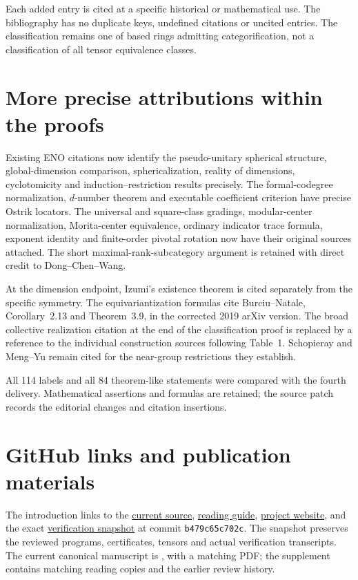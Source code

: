 \documentclass[11pt,a4paper]{article}
\begin{document}
Each added entry is cited at a specific historical or mathematical use.
The bibliography has no duplicate keys, undefined citations or uncited
entries. The classification remains one of based rings admitting
categorification, not a classification of all tensor equivalence classes.

\section*{More precise attributions within the proofs}

Existing ENO citations now identify the pseudo-unitary spherical
structure, global-dimension comparison, sphericalization, reality of
dimensions, cyclotomicity and induction--restriction results precisely.
The formal-codegree normalization, $d$-number theorem and executable
coefficient criterion have precise Ostrik locators. The universal and
square-class gradings, modular-center normalization, Morita-center
equivalence, ordinary indicator trace formula, exponent identity and
finite-order pivotal rotation now have their original sources attached.
The short maximal-rank-subcategory argument is retained with direct
credit to Dong--Chen--Wang.

At the dimension endpoint, Izumi's existence theorem is cited separately
from the specific symmetry. The equivariantization formulas cite
Burciu--Natale, Corollary~2.13 and Theorem~3.9, in the corrected 2019
arXiv version. The broad collective realization citation at the end of
the classification proof is replaced by a reference to the individual
construction sources following Table~1. Schopieray and Meng--Yu remain
cited for the near-group restrictions they establish.

All 114 labels and all 84 theorem-like statements were compared with
the fourth delivery. Mathematical assertions and formulas are retained;
the source patch records the editorial changes and citation insertions.

\section*{GitHub links and publication materials}

The introduction links to the
\href{https://github.com/sebastienpalcoux/grothendieck-ring-classification/blob/main/manuscripts/rank5.tex}{current source},
\href{https://github.com/sebastienpalcoux/grothendieck-ring-classification/blob/main/manuscripts/rank5/README.md}{reading guide},
\href{https://sebastienpalcoux.github.io/grothendieck-ring-classification/}{project website},
and the exact
\href{https://github.com/sebastienpalcoux/grothendieck-ring-classification/tree/b479c65c702c6a09a674df7c2f8468b1a48915d3/supplements/rank5/sharp}{verification snapshot}
at commit \texttt{b479c65c702c}.
The snapshot preserves the reviewed programs, certificates, tensors and
actual verification transcripts. The current canonical manuscript is
, with a matching PDF; the supplement contains
matching reading copies and the earlier review history.
\end{document}
